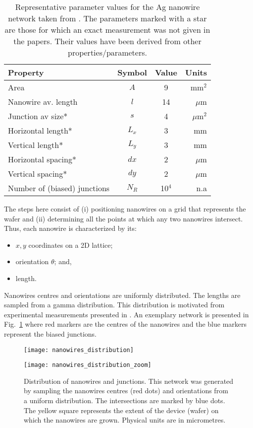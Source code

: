 \documentclass[preprint,10pt, authoryear, a4]{elsarticle}
\begin{document}
\begin{table}[htbp]
\begin{center}
\begin{tabular}{lccr}
\toprule
{\bf Property}     & \bf{Symbol}    & {\bf Value}  & {\bf Units}  \\
\midrule
Area                  &  $A$   & 9  & mm$^{2}$ \\
Nanowire av. length   &  $l$   & 14 & $\mu$m \\
Junction av size*     &  $s$   & 4  & $\mu$m$^{2}$ \\ 
Horizontal length*    &  $L_x$ & 3  & mm      \\
Vertical length*      &  $L_y$ & 3  & mm      \\ 
Horizontal spacing*   &  $dx$  & 2  & $\mu$m \\ 
Vertical spacing*     &  $dy$  & 2  & $\mu$m \\ 
Number of (biased) junctions   & $N_{R}$ & 10$^{4}$ & n.a \\
\bottomrule
\end{tabular}
\caption{
Representative parameter values for the Ag nanowire network taken from
\citep{Higuchi_2016, Bellew2014}. The parameters marked with a star are those for which an
exact measurement was not given in the papers. Their values have been derived
from other properties/parameters.}
\label{table:nominalparameters}
\end{center}
\end{table}

The steps here consist of (i) positioning nanowires on a grid that represents
the wafer and (ii) determining all the points at which any two nanowires
intersect. Thus, each nanowire is characterized by its:

\begin{itemize}
\item $x, y$ coordinates on a 2D lattice;
\item orientation $\theta$; and,
\item length.
\end{itemize}

Nanowires centres and orientations are uniformly distributed. The lengths are
sampled from a gamma distribution. This distribution is motivated from
experimental measurements presented in \citet{Bellew2014}.  An exemplary 
network is presented in Fig.~\ref{fig:wires} where red markers are the centres
of the nanowires and the blue markers represent the biased junctions.


\begin{figure}
\begin{center}
\texttt{[image: nanowires\_distribution]}

\texttt{[image: nanowires\_distribution\_zoom]}
\caption{Distribution of nanowires and junctions. This network was generated by sampling the nanowires centres (red dots) and orientations from a uniform distribution. The intersections are marked by blue dots. The yellow square represents the extent of the device (wafer) on which the nanowires are grown. Physical units are in micrometres.}
\label{fig:wires}
\end{center}
\end{figure}
\end{document}
